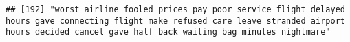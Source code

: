 \documentclass[
]{article}
\begin{document}
\begin{verbatim}
## [192] "worst airline fooled prices pay poor service flight delayed hours gave connecting flight make refused care leave stranded airport hours decided cancel gave half back waiting bag minutes nightmare"                                                                                                                                                                                                                                                                                                                                                                                                                                                                                                                                                                                                                                                                                                                                                                                                                                                                                                                                                                                                                                                                                                                                                                                                                                                                                                                                                                                                                                                                                                                                                                                           

\end{verbatim}
\end{document}
